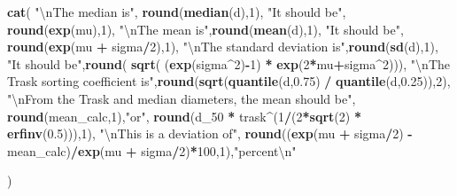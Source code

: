 \documentclass[]{article}
\newenvironment{Shaded}{\begin{snugshade}}{\end{snugshade}}
\newcommand{\KeywordTok}[1]{\textcolor[rgb]{0.13,0.29,0.53}{\textbf{#1}}}
\newcommand{\DecValTok}[1]{\textcolor[rgb]{0.00,0.00,0.81}{#1}}
\newcommand{\FloatTok}[1]{\textcolor[rgb]{0.00,0.00,0.81}{#1}}
\newcommand{\CharTok}[1]{\textcolor[rgb]{0.31,0.60,0.02}{#1}}
\newcommand{\StringTok}[1]{\textcolor[rgb]{0.31,0.60,0.02}{#1}}
\newcommand{\OperatorTok}[1]{\textcolor[rgb]{0.81,0.36,0.00}{\textbf{#1}}}
\newcommand{\NormalTok}[1]{#1}
\begin{document}
\begin{Shaded}
\begin{Highlighting}[]
\KeywordTok{cat}\NormalTok{(}
  \StringTok{"}\CharTok{\textbackslash{}n}\StringTok{The median is"}\NormalTok{, }\KeywordTok{round}\NormalTok{(}\KeywordTok{median}\NormalTok{(d),}\DecValTok{1}\NormalTok{),}
       \StringTok{"It should be"}\NormalTok{, }\KeywordTok{round}\NormalTok{(}\KeywordTok{exp}\NormalTok{(mu),}\DecValTok{1}\NormalTok{),}
      \StringTok{"}\CharTok{\textbackslash{}n}\StringTok{The mean is"}\NormalTok{,}\KeywordTok{round}\NormalTok{(}\KeywordTok{mean}\NormalTok{(d),}\DecValTok{1}\NormalTok{),}
      \StringTok{"It should be"}\NormalTok{, }\KeywordTok{round}\NormalTok{(}\KeywordTok{exp}\NormalTok{(mu }\OperatorTok{+}\StringTok{ }\NormalTok{sigma}\OperatorTok{/}\DecValTok{2}\NormalTok{),}\DecValTok{1}\NormalTok{),}
      \StringTok{"}\CharTok{\textbackslash{}n}\StringTok{The standard deviation is"}\NormalTok{,}\KeywordTok{round}\NormalTok{(}\KeywordTok{sd}\NormalTok{(d),}\DecValTok{1}\NormalTok{),}
      \StringTok{"It should be"}\NormalTok{,}\KeywordTok{round}\NormalTok{( }\KeywordTok{sqrt}\NormalTok{( (}\KeywordTok{exp}\NormalTok{(sigma}\OperatorTok{^}\DecValTok{2}\NormalTok{)}\OperatorTok{-}\DecValTok{1}\NormalTok{) }\OperatorTok{*}\StringTok{ }\KeywordTok{exp}\NormalTok{(}\DecValTok{2}\OperatorTok{*}\NormalTok{mu}\OperatorTok{+}\NormalTok{sigma}\OperatorTok{^}\DecValTok{2}\NormalTok{))),}
      \StringTok{"}\CharTok{\textbackslash{}n}\StringTok{The Trask sorting coefficient is"}\NormalTok{,}\KeywordTok{round}\NormalTok{(}\KeywordTok{sqrt}\NormalTok{(}\KeywordTok{quantile}\NormalTok{(d,}\FloatTok{0.75}\NormalTok{) }\OperatorTok{/}\StringTok{ }\KeywordTok{quantile}\NormalTok{(d,}\FloatTok{0.25}\NormalTok{)),}\DecValTok{2}\NormalTok{),}
  \StringTok{"}\CharTok{\textbackslash{}n}\StringTok{From the Trask and median diameters, the mean should be"}\NormalTok{, }\KeywordTok{round}\NormalTok{(mean_calc,}\DecValTok{1}\NormalTok{),}\StringTok{"or"}\NormalTok{,}
  \KeywordTok{round}\NormalTok{(d_}\DecValTok{50} \OperatorTok{*}\StringTok{ }\NormalTok{trask}\OperatorTok{^}\NormalTok{(}\DecValTok{1}\OperatorTok{/}\NormalTok{(}\DecValTok{2}\OperatorTok{*}\KeywordTok{sqrt}\NormalTok{(}\DecValTok{2}\NormalTok{) }\OperatorTok{*}\StringTok{ }\KeywordTok{erfinv}\NormalTok{(}\FloatTok{0.5}\NormalTok{))),}\DecValTok{1}\NormalTok{),}
  \StringTok{"}\CharTok{\textbackslash{}n}\StringTok{This is a deviation of"}\NormalTok{, }\KeywordTok{round}\NormalTok{((}\KeywordTok{exp}\NormalTok{(mu }\OperatorTok{+}\StringTok{ }\NormalTok{sigma}\OperatorTok{/}\DecValTok{2}\NormalTok{) }\OperatorTok{-}\StringTok{ }\NormalTok{mean_calc)}\OperatorTok{/}\KeywordTok{exp}\NormalTok{(mu }\OperatorTok{+}\StringTok{ }\NormalTok{sigma}\OperatorTok{/}\DecValTok{2}\NormalTok{)}\OperatorTok{*}\DecValTok{100}\NormalTok{,}\DecValTok{1}\NormalTok{),}\StringTok{"percent}\CharTok{\textbackslash{}n}\StringTok{"}
      
\NormalTok{)}
\end{Highlighting}
\end{Shaded}
\end{document}
